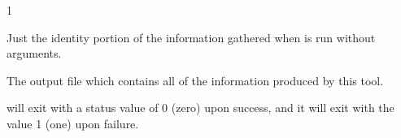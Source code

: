 \begin{ManPage}{\label{man-condor-gather-info}}{1}
\Files

\begin{description}
	\item{} Just the identity portion of the information gathered when  is run without arguments.
	\item{} The output file which contains all of the information produced by this tool.
\end{description}

\ExitStatus

 will exit with a status value of 0 (zero) upon success,
and it will exit with the value 1 (one) upon failure.

\end{ManPage}
